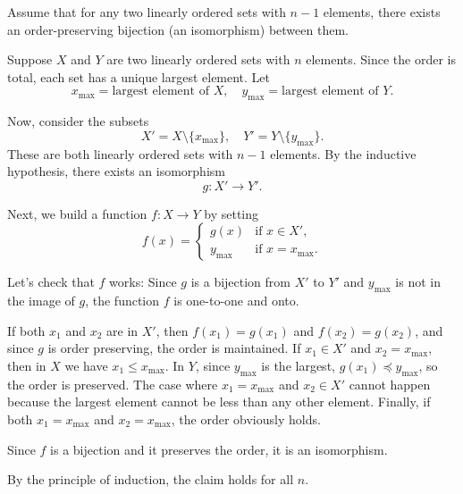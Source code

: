 \documentclass{report}
\begin{document}
\begin{inducthypWithRose}
  Assume that for any two linearly ordered sets with \(n-1\) elements, there exists an order-preserving bijection (an isomorphism) between them.
\end{inducthypWithRose}

\begin{inductstepWithTulip}

  Suppose \(X\) and \(Y\) are two linearly ordered sets with \(n\) elements. Since the order is total, each set has a unique largest element. Let
  \[
  x_{\text{max}} = \text{largest element of } X, \quad y_{\text{max}} = \text{largest element of } Y.
  \]
  
  Now, consider the subsets
  \[
  X' = X \setminus \{x_{\text{max}}\}, \quad Y' = Y \setminus \{y_{\text{max}}\}.
  \]
  These are both linearly ordered sets with \(n-1\) elements. By the inductive hypothesis, there exists an isomorphism 
  \[
  g: X' \to Y'.
  \]

  Next, we build a function \(f: X \to Y\) by setting
  \[
  f(x)=
  \begin{cases}
  g(x) & \text{if } x \in X',\\[1mm]
  y_{\text{max}} & \text{if } x = x_{\text{max}}.
  \end{cases}
  \]

  Let's check that \(f\) works:
  Since \(g\) is a bijection from \(X'\) to \(Y'\) and \(y_{\text{max}}\) is not in the image of \(g\), the function \(f\) is one-to-one and onto.

  \bigskip

  If both \(x_1\) and \(x_2\) are in \(X'\), then \(f(x_1)=g(x_1)\) and \(f(x_2)=g(x_2)\), and since \(g\) is order preserving, the order is maintained.
  If \(x_1 \in X'\) and \(x_2 = x_{\text{max}}\), then in \(X\) we have \(x_1 \leq x_{\text{max}}\). In \(Y\), since \(y_{\text{max}}\) is the largest, \(g(x_1) \preceq y_{\text{max}}\), so the order is preserved.
  The case where \(x_1 = x_{\text{max}}\) and \(x_2 \in X'\) cannot happen because the largest element cannot be less than any other element.
  Finally, if both \(x_1 = x_{\text{max}}\) and \(x_2 = x_{\text{max}}\), the order obviously holds.

  \bigskip

  Since \(f\) is a bijection and it preserves the order, it is an isomorphism. 

  \medskip

  By the principle of induction, the claim holds for all \(n\).

\end{inductstepWithTulip}
\end{document}
